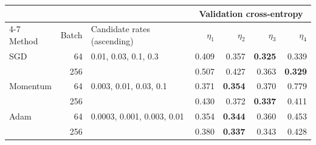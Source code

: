 \begin{tabular}{@{}lr l rrrr@{}}
\toprule
 & & & \multicolumn{4}{c}{Validation cross-entropy} \\
\cmidrule(lr){4-7}
Method & Batch & Candidate rates (ascending) & $\eta_1$ & $\eta_2$ & $\eta_3$ & $\eta_4$ \\
\midrule
SGD & 64 & 0.01, 0.03, 0.1, 0.3 & 0.409 & 0.357 & \textbf{0.325} & 0.339 \\
 & 256 &  & 0.507 & 0.427 & 0.363 & \textbf{0.329} \\
\addlinespace[2pt]
Momentum & 64 & 0.003, 0.01, 0.03, 0.1 & 0.371 & \textbf{0.354} & 0.370 & 0.779 \\
 & 256 &  & 0.430 & 0.372 & \textbf{0.337} & 0.411 \\
\addlinespace[2pt]
Adam & 64 & 0.0003, 0.001, 0.003, 0.01 & 0.354 & \textbf{0.344} & 0.360 & 0.453 \\
 & 256 &  & 0.380 & \textbf{0.337} & 0.343 & 0.428 \\
\bottomrule
\end{tabular}
